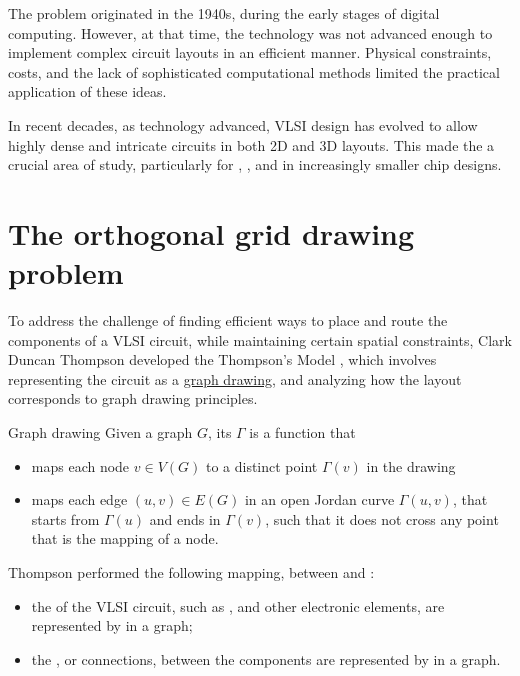 \documentclass[a4paper, 12pt]{report}
\begin{document}
    The problem originated in the 1940s, during the early stages of digital computing. However, at that time, the technology was not advanced enough to implement complex circuit layouts in an efficient manner. Physical constraints, costs, and the lack of sophisticated computational methods limited the practical application of these ideas.

    In recent decades, as technology advanced, VLSI design has evolved to allow highly dense and intricate circuits in both 2D and 3D layouts. This made the  a crucial area of study, particularly for , , and  in increasingly smaller chip designs.

    \section{The orthogonal grid drawing problem}

    To address the challenge of finding efficient ways to place and route the components of a VLSI circuit, while maintaining certain spatial constraints, Clark Duncan Thompson developed the Thompson's Model \cite{thompson}, which involves representing the circuit as a \href{https://en.wikipedia.org/wiki/Graph_drawing}{graph drawing}, and analyzing how the layout corresponds to graph drawing principles.

    \begin{frameddefn}{Graph drawing}
        Given a graph $G$, its  $\Gamma$ is a function that

        \begin{itemize}
            \item maps each node $v \in V(G)$ to a distinct point $\Gamma(v)$ in the drawing
            \item maps each edge $(u, v) \in E(G)$ in an open Jordan curve $\Gamma(u, v)$, that starts from $\Gamma(u)$ and ends in $\Gamma(v)$, such that it does not cross any point that is the mapping of a node.
        \end{itemize}
    \end{frameddefn}

    Thompson performed the following mapping, between  and :

    \begin{itemize}
        \item the  of the VLSI circuit, such as ,  and other electronic elements, are represented by  in a graph;
        \item the , or connections, between the components are represented by  in a graph.
    \end{itemize}
\end{document}
